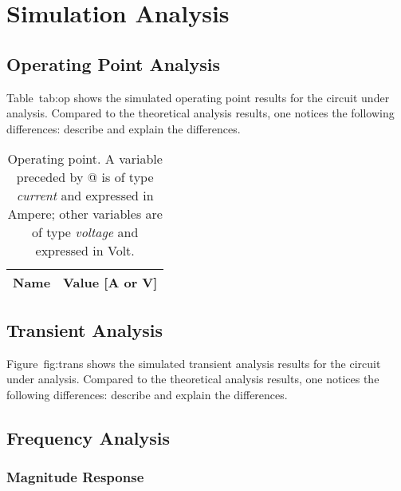 \section{Simulation Analysis}
\label{sec:simulation}

\subsection{Operating Point Analysis}

Table~{tab:op} shows the simulated operating point results for the circuit
under analysis. Compared to the theoretical analysis results, one notices the
following differences: describe and explain the differences.

\begin{table}[h]
  \centering
  \begin{tabular}{|l|r|}
    \hline    
    {\bf Name} & {\bf Value [A or V]} \\ \hline
    
  \end{tabular}
  \caption{Operating point. A variable preceded by @ is of type {\em current}
    and expressed in Ampere; other variables are of type {\it voltage} and expressed in
    Volt.}
  \label{tab:op}
\end{table}

\lipsum[1-1]


\subsection{Transient Analysis}

Figure~{fig:trans} shows the simulated transient analysis results for the
circuit under analysis. Compared to the theoretical analysis results, one
notices the following differences: describe and explain the differences.


\lipsum[1-1]



\subsection{Frequency Analysis}

\subsubsection{Magnitude Response}

